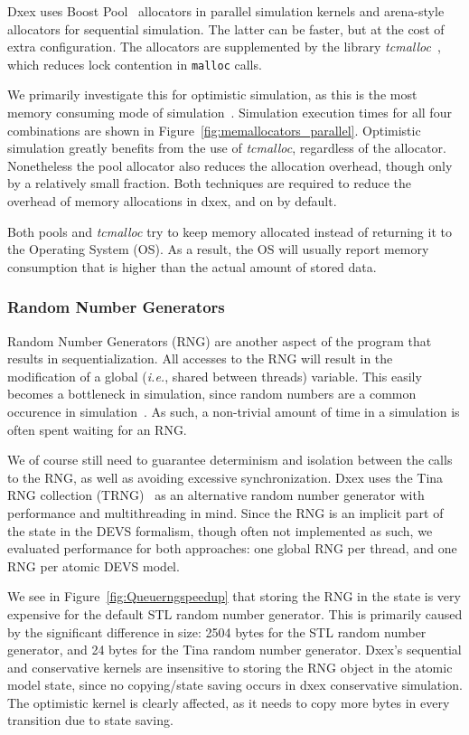 Dxex uses Boost Pool~\cite{boostpool} allocators in parallel simulation kernels and arena-style allocators for sequential simulation.
The latter can be faster, but at the cost of extra configuration.
The allocators are supplemented by the library \textit{tcmalloc}~\cite{tcmalloc}, which reduces lock contention in \texttt{malloc} calls.

We primarily investigate this for optimistic simulation, as this is the most memory consuming mode of simulation~\cite{Fujimoto}.
Simulation execution times for all four combinations are shown in Figure~\ref{fig:memallocators_parallel}.
Optimistic simulation greatly benefits from the use of \textit{tcmalloc}, regardless of the allocator.
Nonetheless the pool allocator also reduces the allocation overhead, though only by a relatively small fraction.
Both techniques are required to reduce the overhead of memory allocations in dxex, and on by default.

Both pools and \textit{tcmalloc} try to keep memory allocated instead of returning it to the Operating System (OS).
As a result, the OS will usually report memory consumption that is higher than the actual amount of stored data.

\subsubsection{Random Number Generators}
Random Number Generators (RNG) are another aspect of the program that results in sequentialization.
All accesses to the RNG will result in the modification of a global (\textit{i.e.}, shared between threads) variable.
This easily becomes a bottleneck in simulation, since random numbers are a common occurence in simulation~\cite{?}.
As such, a non-trivial amount of time in a simulation is often spent waiting for an RNG.

We of course still need to guarantee determinism and isolation between the calls to the RNG, as well as avoiding excessive synchronization.
Dxex uses the Tina RNG collection (TRNG)~\cite{PhysRevE.75.066701} as an alternative random number generator with performance and multithreading in mind.
Since the RNG is an implicit part of the state in the DEVS formalism, though often not implemented as such, we evaluated performance for both approaches: one global RNG per thread, and one RNG per atomic DEVS model.

We see in Figure~\ref{fig:Queuerngspeedup} that storing the RNG in the state is very expensive for the default STL random number generator.
This is primarily caused by the significant difference in size: 2504 bytes for the STL random number generator, and 24 bytes for the Tina random number generator.
Dxex's sequential and conservative kernels are insensitive to storing the RNG object in the atomic model state, since no copying/state saving occurs in dxex conservative simulation.
The optimistic kernel is clearly affected, as it needs to copy more bytes in every transition due to state saving.

